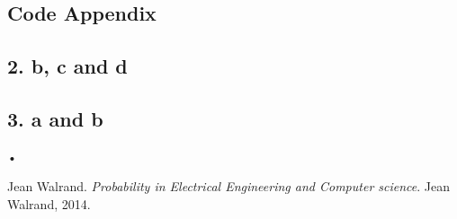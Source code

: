 \documentclass[a4paper,11pt]{article}
\begin{document}
\begin{appendix}
\section*{Code Appendix}
\subsection*{2. b, c and d}\label{q3code}



  
\subsection*{3. a and b}\label{q3code}
  
  
  
  
\end{appendix}•
\begin{thebibliography}{9}


Jean Walrand. 
\textit{Probability in Electrical Engineering and Computer science}. 
Jean Walrand, 2014.

\end{thebibliography}
\end{document}
